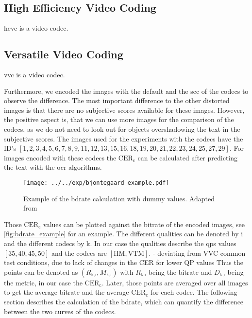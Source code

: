 \subsection{High Efficiency Video Coding}
\label{subsec:hevc}

\gls{hevc} is a video codec.

\subsection{Versatile Video Coding}
\label{subsec:vvc}

\gls{vvc} is a video codec.

Furthermore, we encoded the images with the default and the \gls{scc} of the codecs to observe the difference.
The most important difference to the other distorted images is that there are no subjective scores available for these images.
However, the positive aspect is, that we can use more images for the comparison of the codecs, as we do not need to look out for objects overshadowing the text in the subjective scores.
The images used for the experiments with the codecs have the ID's $[1, 2, 3, 4, 5, 6, 7, 8, 9, 11, 12, 13, 15, 16, 18, 19, 20, 21, 22, 23, 24, 25, 27, 29]$.
For images encoded with these codecs the $\text{CER}_{\text{c}}$ can be calculated after predicting the text with the \gls{ocr} algorithms.

\begin{figure}
    \centering
    \texttt{[image: ../../exp/bjontegaard\_example.pdf]}
    \caption{Example of the \gls{bdrate} calculation with dummy values. Adapted from \cite{bdrate_beyond_2022}}
    \label{fig:bdrate_example}
\end{figure}

Those $\text{CER}_{\text{c}}$ values can be plotted against the bitrate of the encoded images, see \autoref{fig:bdrate_example} for an example.
The different qualities can be denoted by $\text{i}$ and the different codecs by $\text{k}$.
In our case the qualities describe the \glspl{qp} values $[35, 40, 45, 50]$ and the codecs are $[\text{HM}, \text{VTM}]$.
- deviating from VVC common test conditions, due to lack of changes in the CER for lower QP values
Thus the points can be denoted as $\left(R_{\text{k,i}}, M_{\text{k,i}}\right)$ with $R_{\text{k,i}}$ being the bitrate and $D_{\text{k,i}}$ being the metric, in our case the $\text{CER}_{\text{c}}$.
Later, those points are averaged over all images to get the average bitrate and the average $\text{CER}_{\text{c}}$ for each codec.
The following section describes the calculation of the \gls{bdrate}, which can quantify the difference between the two curves of the codecs.

